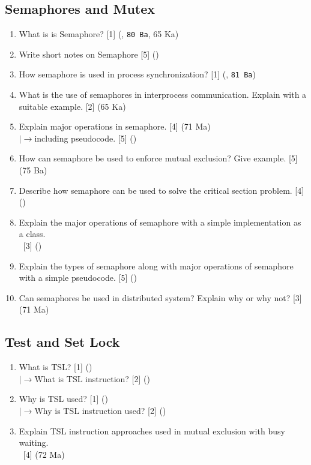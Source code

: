 \documentclass[12pt]{article}
\newcommand{\lb}{\\$\left|\rightarrow\right.$}
\newcommand{\enter}{\\\textcolor{white}{1}}
\begin{document}
	\subsection{Semaphores and Mutex}
		\begin{enumerate}[noitemsep, topsep=0pt]			
			\item What is is Semaphore? \hfill [1] (, \texttt{80 Ba}, 65 Ka)

			\item Write short notes on Semaphore \hfill [5] ()

			\item How semaphore is used in process synchronization? \hfill [1] (, \texttt{81 Ba})
			
			\item What is the use of semaphores in interprocess communication. Explain with a suitable example. \hfill [2] (65 Ka)
			
			\item Explain major operations in semaphore. \hfill [4] (71 Ma)
			\lb including pseudocode. \hfill [5] ()
			
			\item How can semaphore be used to enforce mutual exclusion? Give example. \hfill [5] (75 Ba)
			
			\item Describe how semaphore can be used to solve the critical section problem. \hfill [4] ()
			
			\item Explain the major operations of semaphore with a simple implementation as a class.
			\enter\hfill [3] ()
			
			\item Explain the types of semaphore along with major operations of semaphore with a simple pseudocode. \hfill [5] ()
			
			\item Can semaphores be used in distributed system? Explain why or why not? \hfill [3] (71 Ma)
		\end{enumerate}
		
	\subsection{Test and Set Lock}
		\begin{enumerate}[noitemsep, topsep=0pt]
			\item What is TSL? \hfill [1] ()
			\lb What is TSL instruction? \hfill [2] ()
			
			\item Why is TSL used? \hfill [1] ()
			\lb Why is TSL instruction used? \hfill [2] ()
			
			\item Explain TSL instruction approaches used in mutual exclusion with busy waiting.
			\enter\hfill [4] (72 Ma)
		\end{enumerate}
		
\end{document}
